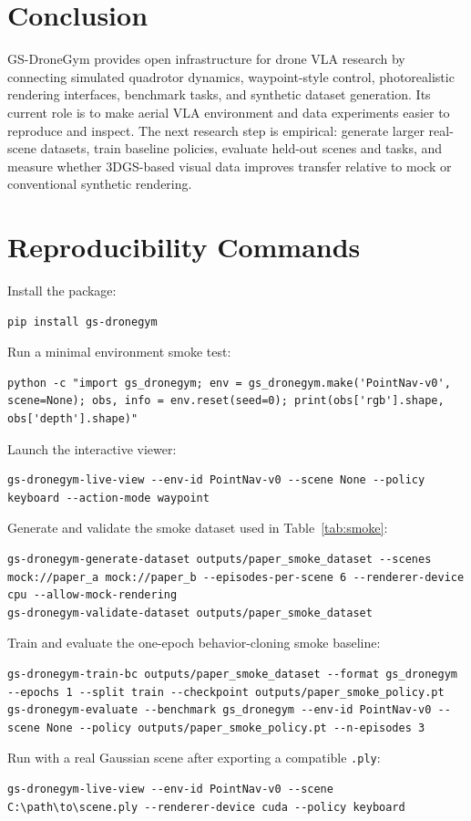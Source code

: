 \documentclass[11pt]{article}
\begin{document}
\section{Conclusion}

GS-DroneGym provides open infrastructure for drone VLA research by connecting simulated quadrotor dynamics, waypoint-style control, photorealistic rendering interfaces, benchmark tasks, and synthetic dataset generation. Its current role is to make aerial VLA environment and data experiments easier to reproduce and inspect. The next research step is empirical: generate larger real-scene datasets, train baseline policies, evaluate held-out scenes and tasks, and measure whether 3DGS-based visual data improves transfer relative to mock or conventional synthetic rendering.

\appendix
\section{Reproducibility Commands}
\label{app:commands}

Install the package:
\begin{lstlisting}
pip install gs-dronegym
\end{lstlisting}

Run a minimal environment smoke test:
\begin{lstlisting}
python -c "import gs_dronegym; env = gs_dronegym.make('PointNav-v0', scene=None); obs, info = env.reset(seed=0); print(obs['rgb'].shape, obs['depth'].shape)"
\end{lstlisting}

Launch the interactive viewer:
\begin{lstlisting}
gs-dronegym-live-view --env-id PointNav-v0 --scene None --policy keyboard --action-mode waypoint
\end{lstlisting}

Generate and validate the smoke dataset used in Table~\ref{tab:smoke}:
\begin{lstlisting}
gs-dronegym-generate-dataset outputs/paper_smoke_dataset --scenes mock://paper_a mock://paper_b --episodes-per-scene 6 --renderer-device cpu --allow-mock-rendering
gs-dronegym-validate-dataset outputs/paper_smoke_dataset
\end{lstlisting}

Train and evaluate the one-epoch behavior-cloning smoke baseline:
\begin{lstlisting}
gs-dronegym-train-bc outputs/paper_smoke_dataset --format gs_dronegym --epochs 1 --split train --checkpoint outputs/paper_smoke_policy.pt
gs-dronegym-evaluate --benchmark gs_dronegym --env-id PointNav-v0 --scene None --policy outputs/paper_smoke_policy.pt --n-episodes 3
\end{lstlisting}

Run with a real Gaussian scene after exporting a compatible \texttt{.ply}:
\begin{lstlisting}
gs-dronegym-live-view --env-id PointNav-v0 --scene C:\path\to\scene.ply --renderer-device cuda --policy keyboard
\end{lstlisting}



\end{document}
